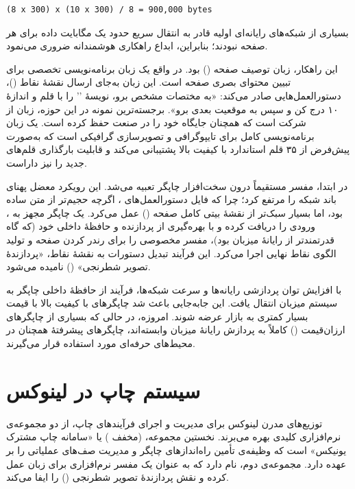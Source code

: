\begin{latin}
\begin{lstlisting}
(8 x 300) x (10 x 300) / 8 = 900,000 bytes
\end{lstlisting}
\end{latin}

بسیاری از شبکه‌های رایانه‌ای اولیه قادر به انتقال سریع حدود یک مگابایت داده برای هر صفحه نبودند؛ بنابراین، ابداع راهکاری هوشمندانه ضروری می‌نمود.

این راهکار، زبان توصیف صفحه () بود.  در واقع یک زبان برنامه‌نویسی تخصصی برای تبیین محتوای بصری صفحه است. این زبان به‌جای ارسال نقشهٔ نقاط ()، دستورالعمل‌هایی صادر می‌کند: «به مختصات مشخص برو، نویسهٔ '' را با قلم  و اندازهٔ ۱۰ درج کن و سپس به موقعیت بعدی برو». برجسته‌ترین نمونه در این حوزه، زبان  از شرکت  است که همچنان جایگاه خود را در صنعت حفظ کرده است.  یک زبان برنامه‌نویسی کامل برای تایپوگرافی و تصویرسازی گرافیکی است که به‌صورت پیش‌فرض از ۳۵ قلم استاندارد با کیفیت بالا پشتیبانی می‌کند و قابلیت بارگذاری قلم‌های جدید را نیز داراست.

در ابتدا، مفسر  مستقیماً درون سخت‌افزار چاپگر تعبیه می‌شد. این رویکرد معضل پهنای باند شبکه را مرتفع کرد؛ چرا که فایل دستورالعمل‌های ، اگرچه حجیم‌تر از متن ساده بود، اما بسیار سبک‌تر از نقشهٔ بیتی کامل صفحه () عمل می‌کرد. یک چاپگر مجهز به ، ورودی را دریافت کرده و با بهره‌گیری از پردازنده و حافظهٔ داخلی خود (که گاه قدرتمندتر از رایانهٔ میزبان بود)، مفسر مخصوصی را برای رندر کردن صفحه و تولید الگوی نقاط نهایی اجرا می‌کرد. این فرآیند تبدیل دستورات به نقشهٔ نقاط، «پردازندهٔ تصویر شطرنجی» () نامیده می‌شود.

با افزایش توان پردازشی رایانه‌ها و سرعت شبکه‌ها، فرآیند  از حافظهٔ داخلی چاپگر به سیستم میزبان انتقال یافت. این جابه‌جایی باعث شد چاپگرهای با کیفیت بالا با قیمت بسیار کمتری به بازار عرضه شوند. امروزه، در حالی که بسیاری از چاپگرهای ارزان‌قیمت () کاملاً به پردازش رایانهٔ میزبان وابسته‌اند، چاپگرهای پیشرفتهٔ  همچنان در محیط‌های حرفه‌ای مورد استفاده قرار می‌گیرند.

\section{سیستم چاپ در لینوکس}

توزیع‌های مدرن لینوکس برای مدیریت و اجرای فرآیندهای چاپ، از دو مجموعه‌ی نرم‌افزاری کلیدی بهره می‌برند. نخستین مجموعه،  (مخفف ) یا «سامانه چاپ مشترک یونیکس» است که وظیفه‌ی تأمین راه‌اندازهای چاپگر و مدیریت صف‌های عملیاتی را بر عهده دارد. مجموعه‌ی دوم،  نام دارد که به عنوان یک مفسر نرم‌افزاری برای زبان  عمل کرده و نقش پردازندهٔ تصویر شطرنجی () را ایفا می‌کند.

